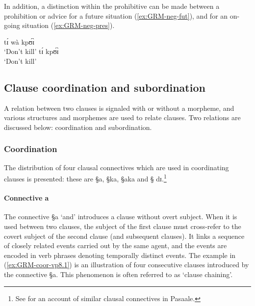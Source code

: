 In addition, a distinction within the prohibitive can be made
between a prohibition or advice for a future situation  (\ref{ex:GRM-neg-fut}), 
and  for an on-going situation (\ref{ex:GRM-neg-pres}). 
\vspace*{10pt}


 \begin{minipage}[h]{12cm}
\begin{exe}
 \ex\label{ex:GRM-neg-fut-pres}
\begin{xlist}
\begin{multicols}{2}
 \ex\label{ex:GRM-neg-fut}
 tɪ́  wà  kpʊ́ɪ̀\\
`Don't kill' 
 \ex\label{ex:GRM-neg-pres}
 tɪ́    kpʊ́ɪ̀\\
`Don't kill'
\end{multicols}
\end{xlist}
\end{exe}

 \end{minipage}
\vspace*{15pt}




\subsection{Clause coordination and subordination}
\label{GRM-clause-coord-subord}

A relation between two clauses is signaled with or without a morpheme,  and 
various  structures and morphemes  are used to relate clauses.  Two
relations are discussed below: coordination and subordination. 

\subsubsection{Coordination}
\label{GRM-clause-coord}


The distribution of four clausal connectives which are used in coordinating
clauses is presented: these are {\S a}, {\S ka}, {\S aka} and {\S
dɪ}.\footnote{See \citet[143-149]{Mcgi99} for an account of similar clausal
connectives in Pasaale.}  


\paragraph{Connective a}
\label{GRM-clause-coord-a}

The connective {\S a} `and'  introduces a clause without overt subject.  When it
is used between two clauses, the subject of the first clause must cross-refer to
the covert subject of the second clause  (and subsequent clauses).
It links a sequence of closely related events carried out by the same agent,
and the events are encoded in  verb
phrases denoting temporally distinct events. The example in
(\ref{ex:GRM-coor-vp8.1}) is  an illustration of four consecutive clauses
introduced by the connective  {\S a}.   This phenomenon is often referred to as
`clause chaining'. 


